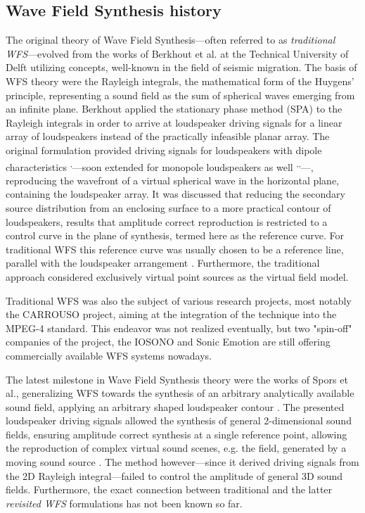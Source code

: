 \documentclass[10pt,twoside]{article}
\theoremstyle{thesisgroupstyle}
\begin{document}
\subsection{Wave Field Synthesis history}
%
The original theory of Wave Field Synthesis---often referred to as \emph{traditional WFS}---evolved from the works of Berkhout et al. at the Technical University of Delft utilizing concepts, well-known in the field of seismic migration.%
The basis of WFS theory were the Rayleigh integrals, the mathematical form of the Huygens' principle, representing a sound field as the sum of spherical waves emerging from an infinite plane.
Berkhout applied the stationary phase method (SPA) to the Rayleigh integrals in order to arrive at loudspeaker driving signals for a linear array of loudspeakers instead of the practically infeasible planar array.
The original formulation provided driving signals for loudspeakers with dipole characteristics \textsuperscript{,}---soon extended for monopole loudspeakers as well \textsuperscript{,}\textsuperscript{,}---, reproducing the wavefront of a virtual spherical wave in the horizontal plane, containing the loudspeaker array.
It was discussed that reducing the secondary source distribution from an enclosing surface to a more practical contour of loudspeakers, results that amplitude correct reproduction is restricted to a control curve in the plane of synthesis, termed here as the reference curve.
For traditional WFS this reference curve was usually chosen to be a reference line, parallel with the loudspeaker arrangement .
Furthermore, the traditional approach considered exclusively virtual point sources as the virtual field model.

Traditional WFS was also the subject of various research projects, most notably the CARROUSO project, aiming at the integration of the technique into the MPEG-4 standard. This endeavor was not realized eventually, but two "spin-off" companies of the project, the IOSONO and Sonic Emotion are still offering commercially available WFS systems nowadays.

The latest milestone in Wave Field Synthesis theory were the works of Spors et al., generalizing WFS towards the synthesis of an arbitrary analytically available sound field, applying an arbitrary shaped loudspeaker contour .
The presented loudspeaker driving signals allowed the synthesis of general 2-dimensional sound fields, ensuring amplitude correct synthesis at a single reference point,
allowing the reproduction of complex virtual sound scenes, e.g. the field, generated by a moving sound source .
The method however---since it derived driving signals from the 2D Rayleigh integral---failed to control the amplitude of general 3D sound fields.
Furthermore, the exact connection between traditional and the latter \emph{revisited WFS} formulations has not been known so far.
\end{document}
